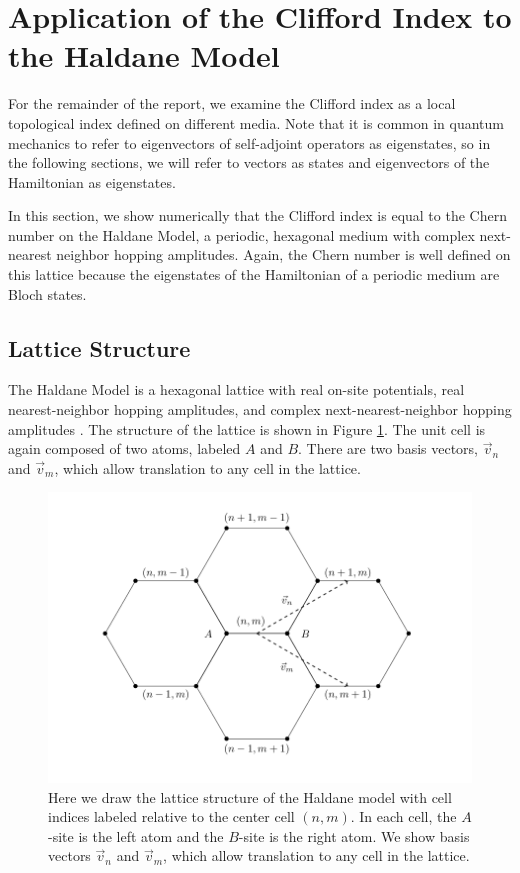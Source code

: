 \documentclass[a4paper]{article}
\begin{document}
\section{Application of the Clifford Index to the Haldane Model} \label{sec:Hald}

For the remainder of the report, we examine the Clifford index as a local topological index defined on different media.
Note that it is common in quantum mechanics to refer to eigenvectors of self-adjoint operators as eigenstates, so in the following sections, we will refer to vectors as states and eigenvectors of the Hamiltonian as eigenstates.

In this section, we show numerically that the Clifford index is equal to the Chern number on the Haldane Model, a periodic, hexagonal medium with complex next-nearest neighbor hopping amplitudes. Again, the Chern number is well defined on this lattice because the eigenstates of the Hamiltonian of a periodic medium are Bloch states.


\subsection{Lattice Structure}
The Haldane Model is a hexagonal lattice with real on-site potentials, real nearest-neighbor hopping amplitudes, and complex next-nearest-neighbor hopping amplitudes \cite{1988Haldane}. The structure of the lattice is shown in Figure \ref{fig:2d Structure}. The unit cell is again composed of two atoms, labeled $A$ and $B$. There are two basis vectors, $\vec{v}_n$ and $\vec{v}_m$, which allow translation to any cell in the lattice.

\begin{figure}
\centering
\includegraphics[width=.7\textwidth]{figures/lattice.png}
\caption{Here we draw the lattice structure of the Haldane model with cell indices labeled relative to the center cell $(n,m)$. In each cell, the 
$A$-site is the left atom and the $B$-site is the right atom. We show basis vectors $\vec{v}_n$ and $\vec{v}_m$, which allow translation to any cell in the lattice.}
\label{fig:2d Structure}%
\end{figure}
\end{document}
